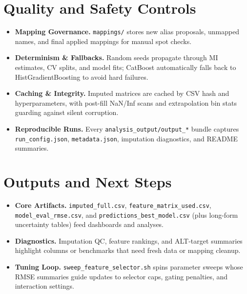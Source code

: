 \documentclass[9pt,twocolumn]{extarticle}
\begin{document}
\section*{Quality and Safety Controls}
\begin{itemize}
  \item \textbf{Mapping Governance.} \texttt{mappings/} stores new alias proposals, unmapped names, and final applied mappings for manual spot checks.
  \item \textbf{Determinism \& Fallbacks.} Random seeds propagate through MI estimates, CV splits, and model fits; CatBoost automatically falls back to HistGradientBoosting to avoid hard failures.
  \item \textbf{Caching \& Integrity.} Imputed matrices are cached by CSV hash and hyperparameters, with post-fill NaN/Inf scans and extrapolation bin stats guarding against silent corruption.
  \item \textbf{Reproducible Runs.} Every \texttt{analysis\_output/output\_*} bundle captures \texttt{run\_config.json}, \texttt{metadata.json}, imputation diagnostics, and README summaries.
\end{itemize}

\section*{Outputs and Next Steps}
\begin{itemize}
  \item \textbf{Core Artifacts.} \texttt{imputed\_full.csv}, \texttt{feature\_matrix\_used.csv}, \texttt{model\_eval\_rmse.csv}, and \texttt{predictions\_best\_model.csv} (plus long-form uncertainty tables) feed dashboards and analyses.
  \item \textbf{Diagnostics.} Imputation QC, feature rankings, and ALT-target summaries highlight columns or benchmarks that need fresh data or mapping cleanup.
  \item \textbf{Tuning Loop.} \texttt{sweep\_feature\_selector.sh} spins parameter sweeps whose RMSE summaries guide updates to selector caps, gating penalties, and interaction settings.
\end{itemize}
\end{document}
